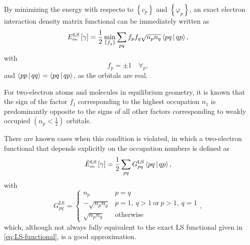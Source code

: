 \begin{enumerate}
        By minimizing the energy with respecto to $\left\{ c_p \right\}$ and
        $\left\{ \varphi_p \right\}$, an exact electron interaction density
        matrix functional can be immediately written as 
        \begin{equation} \label{eq:LS-functional}
            E_{\text{ee}}^{\text{LS}} \left[ \fordm \right] =
            \frac{1}{2} \min_{ \left\{ f_q \right\}} \sum_{pq}
            f_p f_q \sqrt{n_p n_q} \Braket{pq | qp}
            ,
        \end{equation}
        with 
        \begin{equation}
            f_p = \pm 1\quad \forall_p
            ,
        \end{equation}
        and $ \Braket{pp | qq} = \Braket{pq | qp}$, as the orbitals are real.

        For two-electron atoms and molecules in equilibrium geometry, it is 
        known that the sign of the factor $f_1$ corresponding to the highest 
        occupation $n_1$ is predominantly opposite to the signs of all other 
        factors corresponding to weakly occupied $\left( n_p < \frac{1}{2} \right)$
        orbitals.

        There are known cases when this condition is violated, in which a two-electron functional that depends 
        explicitly on the occupation numbers is defined as
        \begin{equation}
            \tilde{E}_{\text{ee}}^{\text{LS}} \left[ \fordm \right] =
            \frac{1}{2} \sum_{pq}  G_{pq}^{\text{LS}} \Braket{pq | qp},
        \end{equation}
        with 
        \begin{equation}
            G_{pq}^{\text{LS}} =
            \begin{cases}
                n_p & p = q \\
                - \sqrt{n_p n_q} & p = 1,\ q > 1\ \mathrm{or}\ p>1,\ q=1 \\
                \sqrt{n_p n_q} & \text{otherwise}
            \end{cases}
            ,
        \end{equation}
        which, although not always fully equivalent to the exact LS functional
        given in \cref{eq:LS-functional}, is a good approximation.


\end{enumerate}
